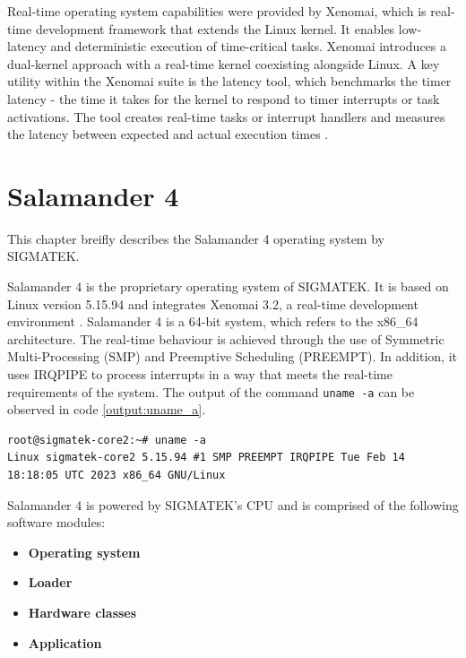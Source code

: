 \documentclass[MMR,Master,english]{twbook}
\begin{document}
\bigskip \noindent Real-time operating system capabilities were provided by Xenomai, which is real-time development framework that extends the Linux kernel. It enables low-latency and deterministic execution of time-critical tasks. Xenomai introduces a dual-kernel approach with a real-time kernel coexisting alongside Linux. A key utility within the Xenomai suite is the latency tool, which benchmarks the timer latency - the time it takes for the kernel to respond to timer interrupts or task activations. The tool creates real-time tasks or interrupt handlers and measures the latency between expected and actual execution times \cite{XenomaiXenomai}.

\clearpage

\chapter{Salamander 4}\label{cha:salamander4}
This chapter breifly describes the Salamander 4 operating system by SIGMATEK.

Salamander 4 is the proprietary operating system of SIGMATEK. It is based on Linux version 5.15.94 and integrates Xenomai 3.2, a real-time development environment \cite{XenomaiXenomai}. Salamander 4 is a 64-bit system, which refers to the x86\_64 architecture. The real-time behaviour is achieved through the use of Symmetric Multi-Processing (SMP) and Preemptive Scheduling (PREEMPT). In addition, it uses IRQPIPE to process interrupts in a way that meets the real-time requirements of the system. The output of the command \texttt{uname -a} can be observed in code \ref{output:uname_a}.

\vspace{1em}
\begin{minipage}{0.95\columnwidth}
	\begin{lstlisting}[name={System information},label={output:uname_a}]
root@sigmatek-core2:~# uname -a
Linux sigmatek-core2 5.15.94 #1 SMP PREEMPT IRQPIPE Tue Feb 14 18:18:05 UTC 2023 x86_64 GNU/Linux
\end{lstlisting}
\end{minipage}

\noindent Salamander 4 is powered by SIGMATEK's CPU and is comprised of the following software modules:

 \begin{itemize}
	\item \textbf{Operating system}
	\item \textbf{Loader}
	\item \textbf{Hardware classes}
	\item \textbf{Application}
\end{itemize}
\end{document}

